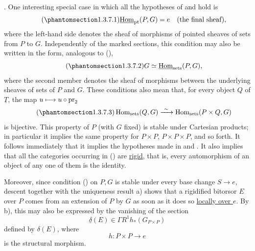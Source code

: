 . One interesting special case in which all the hypotheses of
 and  hold is
\begin{equation}\tag{\SGARefTarget{sga7.sga7i.evii.n1-3-7-1}{1.3.7.1}}
 \underline{\operatorname{Hom}}_{\mathrm{pt}}(P,G)=e
 \quad\text{(the final sheaf)},
\end{equation}
where the left-hand side denotes the sheaf of morphisms of pointed
sheaves of sets from $P$ to $G$. Independently of the marked sections,
this condition may also be written in the form, analogous to (),
\begin{equation}\tag{\SGARefTarget{sga7.sga7i.evii.n1-3-7-2}{1.3.7.2}}
 G\simeq\underline{\operatorname{Hom}}_{\mathrm{sets}}(P,G),
\end{equation}
where the second member denotes the sheaf of morphisms between the
underlying sheaves of sets of $P$ and $G$. These conditions also mean
that, for every object $Q$ of $\underline T$, the map
$u\longmapsto u\circ\operatorname{pr}_2$
\begin{equation}\tag{\SGARefTarget{sga7.sga7i.evii.n1-3-7-3}{1.3.7.3}}
 \operatorname{Hom}_{\mathrm{sets}}(Q,G)
 \xrightarrow{\ \sim\ }
 \operatorname{Hom}_{\mathrm{sets}}(P\times Q,G)
\end{equation}
is bijective. This property of $P$ (with $G$ fixed) is stable under
Cartesian products; in particular it implies the same property for
$P\times P$, $P\times P\times P$, and so forth. It follows immediately
that it implies the hypotheses made in  and . It also implies
that all the categories occurring in () are \underline{rigid},
that is, every automorphism of an object of any one of them is the
identity.

Moreover, since condition () on $P,G$ is stable under every base
change $S\longrightarrow e$, descent together with the uniqueness
result  a) shows that a rigidified bitorsor $E$ over $P$ comes from
an extension of $P$ by $G$ as soon as it does so \underline{locally over
$e$}. By  b), this may also be expressed by the vanishing of the
section
\begin{equation*}
 \underline{\delta}(E)\in\Gamma R^1h_*(G_{P\times P})
\end{equation*}
defined by $\delta(E)$, where
\begin{equation*}
 h:P\times P\longrightarrow e
\end{equation*}
is the structural morphism.

